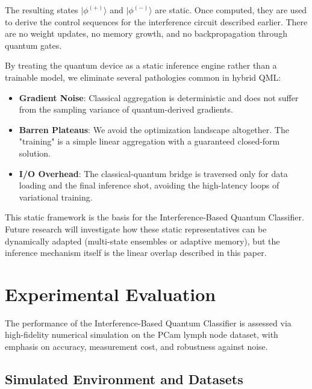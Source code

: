 \documentclass[conference]{IEEEtran}
\begin{document}
The resulting states $|\phi^{(+)}\rangle$ and $|\phi^{(-)}\rangle$ are static. Once computed, they are used to derive the control sequences for the interference circuit described earlier. There are no weight updates, no memory growth, and no backpropagation through quantum gates. 

By treating the quantum device as a static inference engine rather than a trainable model, we eliminate several pathologies common in hybrid QML:
\begin{itemize}
    \item \textbf{Gradient Noise}: Classical aggregation is deterministic and does not suffer from the sampling variance of quantum-derived gradients.
    \item \textbf{Barren Plateaus}: We avoid the optimization landscape altogether. The "training" is a simple linear aggregation with a guaranteed closed-form solution.
    \item \textbf{I/O Overhead}: The classical-quantum bridge is traversed only for data loading and the final inference shot, avoiding the high-latency loops of variational training.
\end{itemize}

This static framework is the basis for the Interference-Based Quantum Classifier. Future research will investigate how these static representatives can be dynamically adapted (multi-state ensembles or adaptive memory), but the inference mechanism itself is the linear overlap described in this paper.

\section{Experimental Evaluation}

The performance of the Interference-Based Quantum Classifier is assessed via high-fidelity numerical simulation on the PCam lymph node dataset, with emphasis on accuracy, measurement cost, and robustness against noise.

\subsection{Simulated Environment and Datasets}
\end{document}
